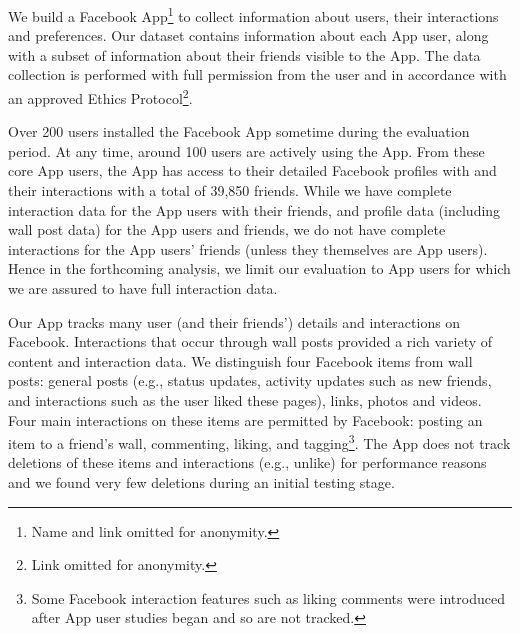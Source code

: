 We build a Facebook App\footnote{Name and link omitted
for anonymity.} to collect information about users, 
their interactions and preferences.  
Our dataset contains information about each App user, 
along with a subset of information about their friends visible to the App.
The data collection is performed with full
permission from the user and in accordance with an approved Ethics
Protocol\footnote{Link omitted for anonymity.}.

Over 200 users installed the Facebook App sometime during the
evaluation period. At any time, around 100 users are actively using the
App. From these core App users, the App has access to their 
detailed Facebook profiles with and their interactions with a total of 39,850 friends.
While we have complete interaction data for the App
users with their friends, and profile data (including
wall post data) for the App users and friends, we do not have complete
interactions for the App users' friends (unless they themselves are
App users).  Hence in the forthcoming analysis, we limit our
evaluation to App users for which we are assured to have full
interaction data.

Our App tracks many user (and their friends') details and interactions on
Facebook. Interactions that occur through wall posts provided a rich
variety of content and interaction data.  We distinguish four
Facebook items from wall posts: general posts (e.g., status updates,
activity updates such as new friends, and interactions such as the
user liked these pages), links, photos and videos. Four main
interactions on these items are permitted by Facebook: posting an item
to a friend's wall, commenting, liking, and tagging\footnote{Some
Facebook interaction features such as liking comments were introduced
after App user studies began and so are not tracked.}.  The App does not
track deletions of these items and interactions (e.g., unlike) for performance reasons and
we found very few deletions during an initial testing stage.


